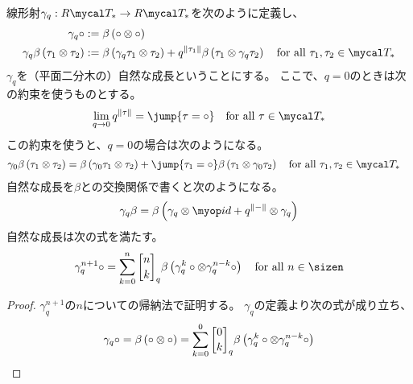 {	線形射$\gamma_q:R\T_*\to R\T_*$を次のように定義し、
	\begin{equation*}\begin{split}
		\gamma_q\circ &:= \beta\lr{\circ\otimes\circ} \\
		\gamma_q\beta\lr{\tau_1\otimes\tau_2} 
		&:= \beta\lr{\gamma_q\tau_1\otimes\tau_2} 
			+ q^{\dabs{\tau_1}} \beta\lr{\tau_1\otimes\gamma_q\tau_2} 
			\quad\text{for all } \tau_1,\tau_2\in\T_*
	\end{split}\end{equation*}
	$\gamma_q$を（平面二分木の）自然な成長ということにする。
	ここで、$q=0$のときは次の約束を使うものとする。
	\begin{equation*}\begin{split}
		\lim_{q\to0}q^{\dabs{\tau}}=\jump{\tau=\circ}
		\quad\text{for all } \tau\in\T_*
	\end{split}\end{equation*}
	この約束を使うと、$q=0$の場合は次のようになる。
	\begin{equation*}\begin{split}
		\gamma_0\beta\lr{\tau_1\otimes\tau_2} 
		&= \beta\lr{\gamma_0\tau_1\otimes\tau_2} 
			+ \jump{\tau_1=\circ}\beta\lr{\tau_1\otimes\gamma_0\tau_2} 
			\quad\text{for all } \tau_1,\tau_2\in\T_*
	\end{split}\end{equation*}
	自然な成長を$\beta$との交換関係で書くと次のようになる。
	\begin{equation*}\begin{split}
		\gamma_q\beta 
		= \beta\lr{\gamma_q\otimes\id + q^{\dabs{-}}\otimes\gamma_q}
	\end{split}\end{equation*}
	自然な成長は次の式を満たす。
	\begin{equation*}\begin{split}
		\gamma_q^{n+1}\circ = \sum_{k=0}^n \qbinom{n}{k}_q
		\beta\lr{\gamma_q^k\circ\otimes\gamma_q^{n-k}\circ}
		\quad\text{for all } n\in\sizen
	\end{split}\end{equation*}
	\begin{proof} %
		$\gamma_q^{n+1}$の$n$についての帰納法で証明する。
		$\gamma_q$の定義より次の式が成り立ち、
		\begin{equation*}\begin{split}
			\gamma_q\circ = \beta\lr{\circ\otimes\circ} 
			= \sum_{k=0}^0 \qbinom{0}{k}_q
			\beta\lr{\gamma_q^k\circ\otimes\gamma_q^{n-k}\circ}
		\end{split}\end{equation*}

\end{proof}}
